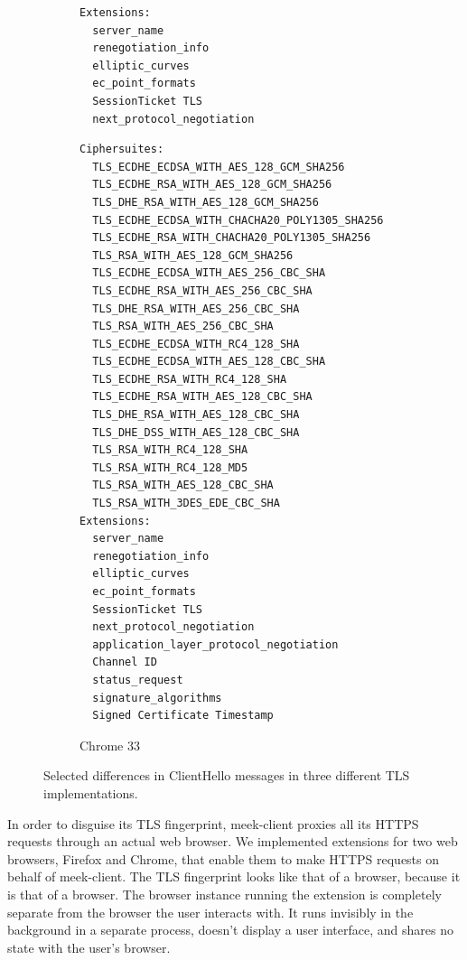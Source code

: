 \documentclass[conference]{IEEEtran}
\newcommand{\meekclient}{\mbox{meek-client}\xspace}
\begin{document}
\begin{figure}
\begin{subfigure}[t]{0.30\textwidth}
\begin{minipage}[t][57ex][t]{\textwidth}
\begin{verbatim}
Extensions:
  server_name
  renegotiation_info
  elliptic_curves
  ec_point_formats
  SessionTicket TLS
  next_protocol_negotiation
\end{verbatim}
\end{minipage}
\label{fig:ciphersuites:firefox}
\end{subfigure}
%
\begin{subfigure}[t]{0.30\textwidth}
\caption{Chrome 33}
\begin{minipage}[t][42.5ex][t]{\textwidth}
\tiny
\begin{verbatim}
Ciphersuites:
  TLS_ECDHE_ECDSA_WITH_AES_128_GCM_SHA256
  TLS_ECDHE_RSA_WITH_AES_128_GCM_SHA256
  TLS_DHE_RSA_WITH_AES_128_GCM_SHA256
  TLS_ECDHE_ECDSA_WITH_CHACHA20_POLY1305_SHA256
  TLS_ECDHE_RSA_WITH_CHACHA20_POLY1305_SHA256
  TLS_RSA_WITH_AES_128_GCM_SHA256
  TLS_ECDHE_ECDSA_WITH_AES_256_CBC_SHA
  TLS_ECDHE_RSA_WITH_AES_256_CBC_SHA
  TLS_DHE_RSA_WITH_AES_256_CBC_SHA
  TLS_RSA_WITH_AES_256_CBC_SHA
  TLS_ECDHE_ECDSA_WITH_RC4_128_SHA
  TLS_ECDHE_ECDSA_WITH_AES_128_CBC_SHA
  TLS_ECDHE_RSA_WITH_RC4_128_SHA
  TLS_ECDHE_RSA_WITH_AES_128_CBC_SHA
  TLS_DHE_RSA_WITH_AES_128_CBC_SHA
  TLS_DHE_DSS_WITH_AES_128_CBC_SHA
  TLS_RSA_WITH_RC4_128_SHA
  TLS_RSA_WITH_RC4_128_MD5
  TLS_RSA_WITH_AES_128_CBC_SHA
  TLS_RSA_WITH_3DES_EDE_CBC_SHA
Extensions:
  server_name
  renegotiation_info
  elliptic_curves
  ec_point_formats
  SessionTicket TLS
  next_protocol_negotiation
  application_layer_protocol_negotiation
  Channel ID
  status_request
  signature_algorithms
  Signed Certificate Timestamp
\end{verbatim}
\end{minipage}
\label{fig:ciphersuites:chrome}
\end{subfigure}

\caption{
Selected differences in ClientHello messages in three different TLS implementations.
}
\label{fig:ciphersuites}
\end{figure}

In order to disguise its TLS fingerprint,
\meekclient proxies all its HTTPS requests through an actual web browser.
We implemented extensions for two web browsers,
Firefox and Chrome,
that enable them to make HTTPS requests on behalf of \meekclient.
The TLS fingerprint looks like that of a browser, because it is that of a browser.
The browser instance running the extension is completely separate
from the browser the user interacts with.
It runs invisibly in the background in a separate process,
doesn't display a user interface,
and shares no state with the user's browser.
\end{document}
